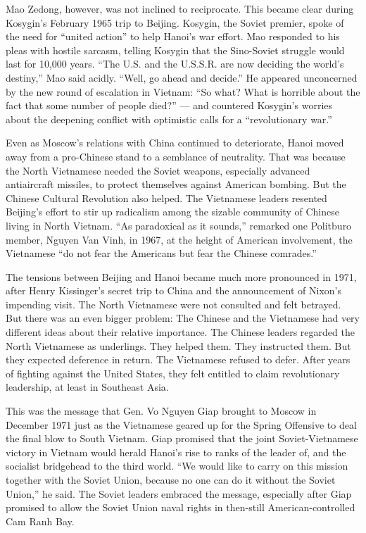 Mao Zedong, however, was not inclined to reciprocate. This became clear
during Kosygin's February 1965 trip to Beijing. Kosygin, the Soviet
premier, spoke of the need for ``united action'' to help Hanoi's war
effort. Mao responded to his pleas with hostile sarcasm, telling Kosygin
that the Sino-Soviet struggle would last for 10,000 years. ``The U.S.
and the U.S.S.R. are now deciding the world's destiny,'' Mao said
acidly. ``Well, go ahead and decide.'' He appeared unconcerned by the
new round of escalation in Vietnam: ``So what? What is horrible about
the fact that some number of people died?'' --- and countered Kosygin's
worries about the deepening conflict with optimistic calls for a
``revolutionary war.''

Even as Moscow's relations with China continued to deteriorate, Hanoi
moved away from a pro-Chinese stand to a semblance of neutrality. That
was because the North Vietnamese needed the Soviet weapons, especially
advanced antiaircraft missiles, to protect themselves against American
bombing. But the Chinese Cultural Revolution also helped. The Vietnamese
leaders resented Beijing's effort to stir up radicalism among the
sizable community of Chinese living in North Vietnam. ``As paradoxical
as it sounds,'' remarked one Politburo member, Nguyen Van Vinh, in 1967,
at the height of American involvement, the Vietnamese ``do not fear the
Americans but fear the Chinese comrades.''

The tensions between Beijing and Hanoi became much more pronounced in
1971, after Henry Kissinger's secret trip to China and the announcement
of Nixon's impending visit. The North Vietnamese were not consulted and
felt betrayed. But there was an even bigger problem: The Chinese and the
Vietnamese had very different ideas about their relative importance. The
Chinese leaders regarded the North Vietnamese as underlings. They helped
them. They instructed them. But they expected deference in return. The
Vietnamese refused to defer. After years of fighting against the United
States, they felt entitled to claim revolutionary leadership, at least
in Southeast Asia.

This was the message that Gen. Vo Nguyen Giap brought to Moscow in
December 1971 just as the Vietnamese geared up for the Spring Offensive
to deal the final blow to South Vietnam. Giap promised that the joint
Soviet-Vietnamese victory in Vietnam would herald Hanoi's rise to ranks
of the leader of, and the socialist bridgehead to the third world. ``We
would like to carry on this mission together with the Soviet Union,
because no one can do it without the Soviet Union,'' he said. The Soviet
leaders embraced the message, especially after Giap promised to allow
the Soviet Union naval rights in then-still American-controlled Cam Ranh
Bay.

